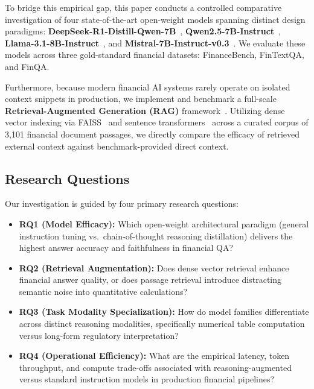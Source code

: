 \documentclass[11pt]{article}
\begin{document}
To bridge this empirical gap, this paper conducts a controlled comparative investigation of four state-of-the-art open-weight models spanning distinct design paradigms: \textbf{DeepSeek-R1-Distill-Qwen-7B}~\citep{deepseek2025r1}, \textbf{Qwen2.5-7B-Instruct}~\citep{yang2024qwen25}, \textbf{Llama-3.1-8B-Instruct}~\citep{meta2024llama3}, and \textbf{Mistral-7B-Instruct-v0.3}~\citep{jiang2023mistral}. We evaluate these models across three gold-standard financial datasets: FinanceBench, FinTextQA, and FinQA. 

Furthermore, because modern financial AI systems rarely operate on isolated context snippets in production, we implement and benchmark a full-scale \textbf{Retrieval-Augmented Generation (RAG)} framework~\citep{lewis2020rag}. Utilizing dense vector indexing via FAISS~\citep{johnson2019faiss} and sentence transformers~\citep{reimers2019sentencebert} across a curated corpus of 3,101 financial document passages, we directly compare the efficacy of retrieved external context against benchmark-provided direct context.

\subsection{Research Questions}
Our investigation is guided by four primary research questions:
\begin{itemize}
    \item \textbf{RQ1 (Model Efficacy):} Which open-weight architectural paradigm (general instruction tuning vs.\ chain-of-thought reasoning distillation) delivers the highest answer accuracy and faithfulness in financial QA?
    \item \textbf{RQ2 (Retrieval Augmentation):} Does dense vector retrieval enhance financial answer quality, or does passage retrieval introduce distracting semantic noise into quantitative calculations?
    \item \textbf{RQ3 (Task Modality Specialization):} How do model families differentiate across distinct reasoning modalities, specifically numerical table computation versus long-form regulatory interpretation?
    \item \textbf{RQ4 (Operational Efficiency):} What are the empirical latency, token throughput, and compute trade-offs associated with reasoning-augmented versus standard instruction models in production financial pipelines?
\end{itemize}
\end{document}
